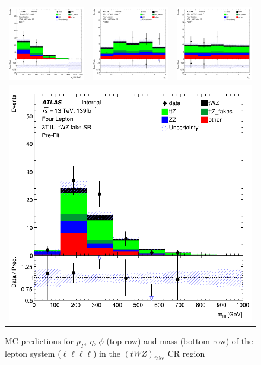 \begin{figure}[htbp]
\centering
  \begin{tabular}{ccc}

    \includegraphics[width=.2\textwidth]{figures/PreFitPlots/lep4_tWZ_3T1L_llll_sys_pt}&
    \includegraphics[width=.2\textwidth]{figures/PreFitPlots/lep4_tWZ_3T1L_llll_sys_eta} &
    \includegraphics[width=.2\textwidth]{figures/PreFitPlots/lep4_tWZ_3T1L_llll_sys_phi} \\
    \multicolumn{3}{c}{\includegraphics[width=.2\textwidth]{figures/PreFitPlots/lep4_tWZ_3T1L_llll_sys_mass}}

  \end{tabular}
  \caption{MC predictions for $p_{T}$, $\eta$, $\phi$ (top row) and mass (bottom row) of the lepton system ($\ell \ell \ell \ell$) in the $(tWZ)_{\text{fake}}$ CR region }
  \label{fig:4lep-3T1L-CR-Lep-sys-Plots}
\end{figure}


